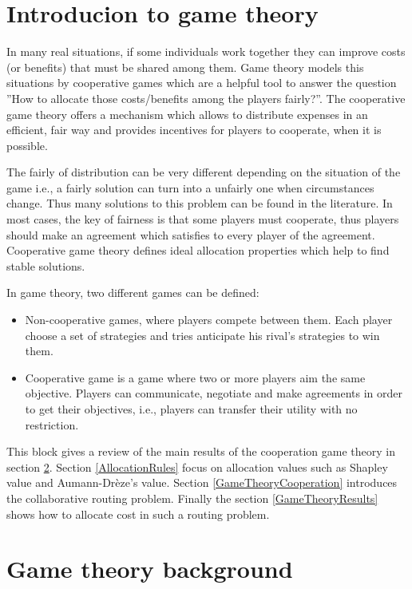 \section{Introducion to game theory}\label{GameTheoryIntro}
In many real situations, if some individuals work together they can improve costs (or benefits) that must be shared among them. Game theory models this situations by cooperative games which are a helpful tool to answer the question ''How to allocate those costs/benefits among the players fairly?''. The cooperative game theory offers a mechanism which allows to distribute expenses in an efficient, fair way and provides incentives for players to cooperate, when it is possible.

The fairly of distribution can be very different depending on the situation of the game i.e., a fairly solution can turn into a unfairly one when circumstances change. Thus many solutions to this problem can be found in the literature. In most cases, the key of fairness is that some players must cooperate, thus players should make an agreement which satisfies to every player of the agreement. Cooperative game theory defines ideal allocation properties which help to find 	
stable solutions.

In game theory, two different games can be defined:
\begin{itemize}
	\item Non-cooperative games, where players compete between them. Each player choose a set of strategies and tries anticipate his rival's strategies to win them.
	\item Cooperative game is a game where two or more players aim the same objective. Players can communicate, negotiate and make agreements in order to get their objectives, i.e., players can transfer their utility with no restriction.
\end{itemize} 

This block gives a review of the main results of the cooperation game theory in section \ref{GameTheoryBackground}. Section \ref{AllocationRules} focus on allocation values such as Shapley value and Aumann-Dr\`eze's value. Section \ref{GameTheoryCooperation} introduces the collaborative routing problem. Finally the section \ref{GameTheoryResults} shows how to allocate cost in such a routing problem.


\section{Game theory background}\label{GameTheoryBackground}

